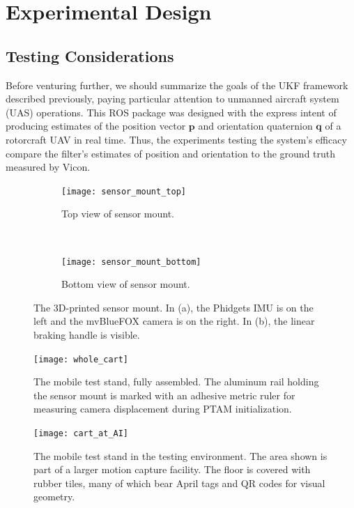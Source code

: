 \chapter{Experimental Design} \label{ch:Exp_Design}

\section{Testing Considerations}

Before venturing further, we should summarize the goals of the UKF framework described previously, paying particular attention to unmanned aircraft system (UAS) operations. This ROS package was designed with the express intent of producing estimates of the position vector $\mathbf{p}$ and orientation quaternion $\mathbf{q}$ of a rotorcraft UAV in real time. Thus, the experiments testing the system's efficacy compare the filter's estimates of position and orientation to the ground truth measured by Vicon.

\begin{figure}[t]
    \centering
    \begin{subfigure}[t]{0.5\textwidth}
        \centering
        \texttt{[image: sensor\_mount\_top]}
        \caption{Top view of sensor mount.}
    \end{subfigure}%
    ~ 
    \begin{subfigure}[t]{0.5\textwidth}
        \centering
        \texttt{[image: sensor\_mount\_bottom]}
        \caption{Bottom view of sensor mount.}
    \end{subfigure}
    \caption[3D-printed sensor mount]{The 3D-printed sensor mount. In (a), the Phidgets IMU is on the left and the mvBlueFOX camera is on the right. In (b), the linear braking handle is visible.}
    \label{fig:sensor_mount}
\end{figure}

\begin{figure}
  \centering
    \texttt{[image: whole\_cart]}
  \caption[Mobile Test Stand]{The mobile test stand, fully assembled. The aluminum rail holding the sensor mount is marked with an adhesive metric ruler for measuring camera displacement during PTAM initialization.}
  \label{fig:whole_cart}
\end{figure}

\begin{figure}
  \centering
    \texttt{[image: cart\_at\_AI]}
  \caption[Testing Environment]{The mobile test stand in the testing environment. The area shown is part of a larger motion capture facility. The floor is covered with rubber tiles, many of which bear April tags and QR codes for visual geometry.}
  \label{fig:cart_at_AI}
\end{figure}


